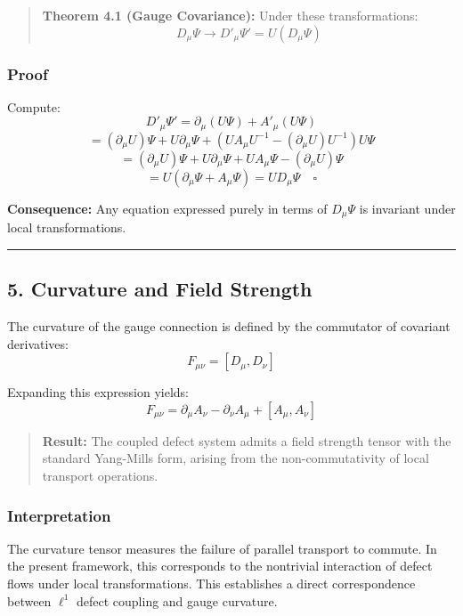 \documentclass[
]{article}
\begin{document}
\begin{quote}
\textbf{Theorem 4.1 (Gauge Covariance):} Under these transformations:
\[ D_\mu \Psi \rightarrow D'_\mu \Psi' = U (D_\mu \Psi) \]
\end{quote}

\subsubsection{Proof}\label{proof-1}

Compute: \[ D'_\mu \Psi' = \partial_\mu (U\Psi) + A'_\mu (U\Psi) \]
\[ = (\partial_\mu U)\Psi + U \partial_\mu \Psi + \left(U A_\mu U^{-1} - (\partial_\mu U)U^{-1}\right) U\Psi \]
\[ = (\partial_\mu U)\Psi + U \partial_\mu \Psi + U A_\mu \Psi - (\partial_\mu U)\Psi \]
\[ = U(\partial_\mu \Psi + A_\mu \Psi) = U D_\mu \Psi \quad \square \]

\textbf{Consequence:} Any equation expressed purely in terms of
\(D_\mu \Psi\) is invariant under local transformations.

\begin{center}\rule{0.5\linewidth}{0.5pt}\end{center}

\subsection{5. Curvature and Field
Strength}\label{curvature-and-field-strength}

The curvature of the gauge connection is defined by the commutator of
covariant derivatives: \[ F_{\mu\nu} = [D_\mu, D_\nu] \]

Expanding this expression yields:
\[ F_{\mu\nu} = \partial_\mu A_\nu - \partial_\nu A_\mu + [A_\mu, A_\nu] \]

\begin{quote}
\textbf{Result:} The coupled defect system admits a field strength
tensor with the standard Yang-Mills form, arising from the
non-commutativity of local transport operations.
\end{quote}

\subsubsection{Interpretation}\label{interpretation}

The curvature tensor measures the failure of parallel transport to
commute. In the present framework, this corresponds to the nontrivial
interaction of defect flows under local transformations. This
establishes a direct correspondence between \(\ell^1\) defect coupling
and gauge curvature.
\end{document}
